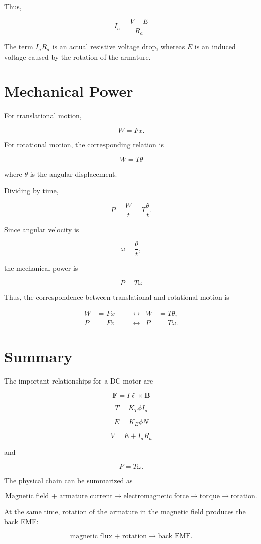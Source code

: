 \documentclass[11pt,a4paper]{article}
\begin{document}
Thus,

\[
\boxed{
I_a = \frac{V-E}{R_a}
}
\]

The term $I_aR_a$ is an actual resistive voltage drop, whereas $E$ is
an induced voltage caused by the rotation of the armature.

\section{Mechanical Power}

For translational motion,

\[
W = Fx.
\]

For rotational motion, the corresponding relation is

\[
\boxed{
W = T\theta
}
\]

where $\theta$ is the angular displacement.

Dividing by time,

\[
P
=
\frac{W}{t}
=
T\frac{\theta}{t}.
\]

Since angular velocity is

\[
\omega = \frac{\theta}{t},
\]

the mechanical power is

\[
\boxed{
P = T\omega
}
\]

Thus, the correspondence between translational and rotational motion is

\[
\boxed{
\begin{aligned}
W &= Fx
&\quad&\longleftrightarrow&
W &= T\theta,\\
P &= Fv
&&\longleftrightarrow&
P &= T\omega.
\end{aligned}
}
\]

\section{Summary}

The important relationships for a DC motor are

\[
\boxed{
\bm{F}=I\bm{\ell}\times\bm{B}
}
\]

\[
\boxed{
T=K_T\phi I_a
}
\]

\[
\boxed{
E=K_E\phi N
}
\]

\[
\boxed{
V=E+I_aR_a
}
\]

and

\[
\boxed{
P=T\omega.
}
\]

The physical chain can be summarized as

\[
\text{Magnetic field + armature current}
\longrightarrow
\text{electromagnetic force}
\longrightarrow
\text{torque}
\longrightarrow
\text{rotation}.
\]

At the same time, rotation of the armature in the magnetic field
produces the back EMF:

\[
\text{magnetic flux + rotation}
\longrightarrow
\text{back EMF}.
\]
\end{document}
